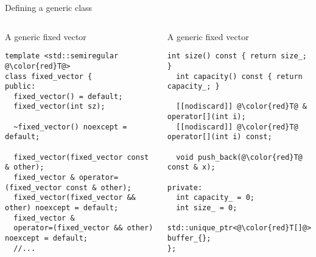 \begin{frame}[t,fragile]{Defining a generic class}

\begin{columns}[T]

\begin{block}{A generic fixed vector}
\begin{lstlisting}[escapechar=@]
template <std::semiregular @\color{red}T@>
class fixed_vector {
public:
  fixed_vector() = default;
  fixed_vector(int sz);

  ~fixed_vector() noexcept = default;

  fixed_vector(fixed_vector const & other);
  fixed_vector & operator=(fixed_vector const & other);
  fixed_vector(fixed_vector && other) noexcept = default;
  fixed_vector & 
  operator=(fixed_vector && other) noexcept = default;
  //...
\end{lstlisting}
\end{block}

\begin{block}{A generic fixed vector}
\begin{lstlisting}[escapechar=@]
  int size() const { return size_; }
  int capacity() const { return capacity_; }

  [[nodiscard]] @\color{red}T@ & operator[](int i);
  [[nodiscard]] @\color{red}T@ operator[](int i) const;

  void push_back(@\color{red}T@ const & x);

private:
  int capacity_ = 0;
  int size_ = 0;
  std::unique_ptr<@\color{red}T[]@> buffer_{};
};
\end{lstlisting}
\end{block}

\end{columns}
\end{frame}


